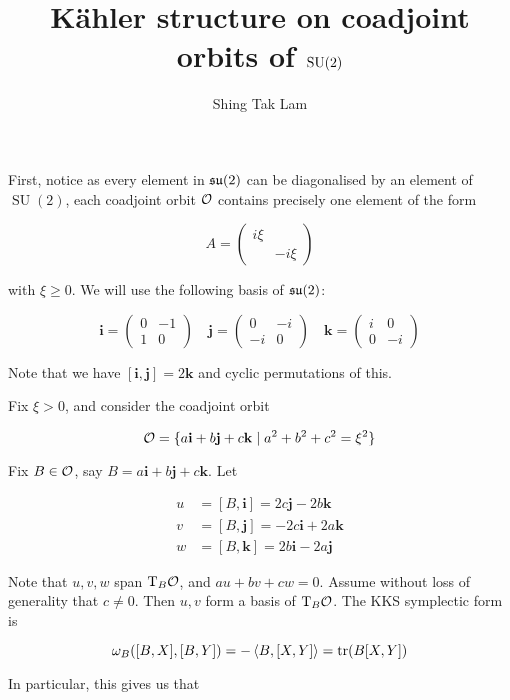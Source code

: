 \documentclass{article}
\title{K\"ahler structure on coadjoint orbits of \(\SU(2)\)}
\author{Shing Tak Lam}
\DeclareMathOperator{\SU}{SU}
\newcommand{\su}{\mfs\mfu}
\begin{document}
\maketitle

First, notice as every element in \(\su(2)\) can be diagonalised by an element of \(\SU(2)\), each coadjoint orbit \(\mathcal{O}\) contains precisely one element of the form

\[A = \begin{pmatrix}
    i\xi \\ & -i\xi
\end{pmatrix}\]

with \(\xi \ge 0\). We will use the following basis of \(\su(2)\):

\[\mathbf i = \begin{pmatrix}
    0 & -1 \\ 1 & 0
\end{pmatrix} \quad \mathbf j = \begin{pmatrix}
    0 & -i \\ -i & 0
\end{pmatrix} \quad \mathbf k = \begin{pmatrix}
    i & 0 \\ 0 & -i
\end{pmatrix}\]

Note that we have \([\mathbf i, \mathbf j] = 2\mathbf k\) and cyclic permutations of this.

Fix \(\xi > 0\), and consider the coadjoint orbit

\[\mathcal{O} = \{a\mathbf{i} + b \mathbf{j} + c\mathbf{k} \mid a^2 + b^2 + c^2 = \xi^2\}\]

Fix \(B \in \mathcal{O}\), say \(B = a\mathbf{i} + b \mathbf{j} + c \mathbf {k}\). Let

\begin{align*}
    u &= [B, \mathbf{i}] = 2c\mathbf{j} - 2b \mathbf{k} \\
    v &= [B, \mathbf{j}] = -2c \mathbf{i} + 2a \mathbf{k} \\
    w &= [B, \mathbf{k}] = 2b \mathbf{i} - 2a \mathbf{j}
\end{align*}

Note that \(u, v, w\) span \(\mathrm{T}_B\mathcal{O}\), and \(au + bv + cw = 0\). Assume without loss of generality that \(c \ne 0\). Then \(u, v\) form a basis of \(\mathrm{T}_B\mathcal{O}\). The KKS symplectic form is

\[\omega_B([B, X], [B, Y]) = -\left\langle B, [X, Y] \right\rangle = \tr(B[X, Y])\]

In particular, this gives us that
\end{document}

